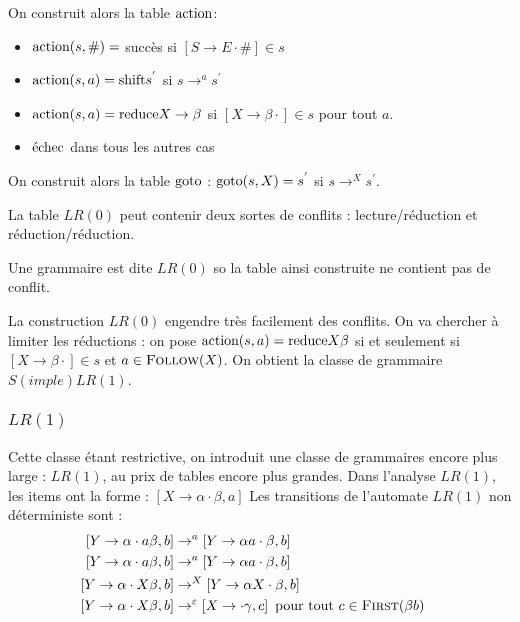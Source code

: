 \documentclass{cours}
\begin{document}
On construit alors la table $\textmd{action}$:
\begin{itemize}
    \item $\textmd{action}(s, \#) = $ succès si $\left[S \rightarrow E \cdot \#\right] \in s$
    \item $\textmd{action}(s, a) = \textmd{shift} s^{'}$ si $s\rightarrow^{a} s^{'}$
    \item $\textmd{action}(s, a) = \textmd{reduce} X \rightarrow \beta$ si $\left[X \rightarrow \beta\cdot \right] \in s$ pour tout $a$.
    \item $\textmd{échec}$ dans tous les autres cas
\end{itemize}

On construit alors la table $\textmd{goto}$ : $\textmd{goto}(s, X) = s^{'}$ si $s \rightarrow^{X} s^{'}$.

La table $LR(0)$ peut contenir deux sortes de conflits : lecture/réduction et réduction/réduction.
\begin{definition}
    Une grammaire est dite $LR(0)$ so la table ainsi construite ne contient pas de conflit.
\end{definition}
La construction $LR(0)$ engendre très facilement des conflits. On va chercher à limiter les réductions : 
on pose $\textmd{action}(s, a) = \textmd{reduce} X \beta$ si et seulement si $\left[X \rightarrow \beta\cdot\right] \in s$ et $a \in \textsc{Follow}(X)$. On obtient la classe de grammaire $S(imple)LR(1)$.

\subsubsection{$LR(1)$}
Cette classe étant restrictive, on introduit une classe de grammaires encore plus large : $LR(1)$, au prix de tables encore plus grandes. Dans l'analyse $LR(1)$, les items ont la forme : $\left[X \rightarrow \alpha \cdot \beta, a\right]$
Les transitions de l'automate $LR(1)$ non déterministe sont : 
\begin{equation*}
    \begin{aligned}
        \left[Y \rightarrow \alpha \cdot a\beta, b\right] &\rightarrow^{a} \left[Y \rightarrow \alpha a \cdot \beta, b\right]&\\\left[Y \rightarrow \alpha \cdot a\beta, b\right] &\rightarrow^{a} \left[Y \rightarrow \alpha a \cdot \beta, b\right]&\\
        \left[Y \rightarrow \alpha \cdot X\beta, b\right] &\rightarrow^{X} \left[Y \rightarrow \alpha X \cdot \beta, b\right]&\\
        \left[Y \rightarrow \alpha \cdot X\beta, b\right] &\rightarrow^{\epsilon} \left[X \rightarrow \cdot\gamma, c\right] \text{ pour tout } c \in \textsc{First}(\beta b)&
    \end{aligned}
\end{equation*}
\end{document}
